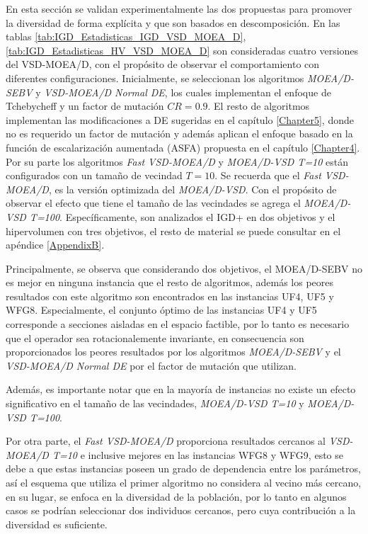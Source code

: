 En esta sección se validan experimentalmente las dos propuestas para promover la diversidad de forma explícita y que son basados en descomposición.
%
En las tablas \ref{tab:IGD_Estadisticas_IGD_VSD_MOEA_D}, \ref{tab:IGD_Estadisticas_HV_VSD_MOEA_D} son consideradas cuatro versiones del VSD-MOEA/D, con el propósito de observar el comportamiento con diferentes configuraciones.
%
Inicialmente, se seleccionan los algoritmos \textit{MOEA/D-SEBV} y \textit{VSD-MOEA/D Normal DE}, los cuales implementan el enfoque de Tchebycheff y un factor de mutación $CR=0.9$.
%
El resto de algoritmos implementan las modificaciones a DE sugeridas en el capítulo \ref{Chapter5}, donde no es requerido un factor de mutación y además aplican el enfoque basado en la función de escalarización aumentada (ASFA) propuesta en el capítulo \ref{Chapter4}.
%
Por su parte los algoritmos \textit{Fast VSD-MOEA/D} y \textit{MOEA/D-VSD T=10} están configurados con un tamaño de vecindad $T=10$.
%
Se recuerda que el \textit{Fast VSD-MOEA/D}, es la versión optimizada del \textit{MOEA/D-VSD}.
%
Con el propósito de observar el efecto que tiene el tamaño de las vecindades se agrega el \textit{MOEA/D-VSD T=100}.
%
Específicamente, son analizados el IGD+ en dos objetivos y el hipervolumen con tres objetivos, el resto de material se puede consultar en el apéndice \ref{AppendixB}.

Principalmente, se observa que considerando dos objetivos, el MOEA/D-SEBV no es mejor en ninguna instancia que el resto de algoritmos, además los peores resultados con este algoritmo son encontrados en las instancias UF4, UF5 y WFG8.
%
Especialmente, el conjunto óptimo de las instancias UF4 y UF5 corresponde a secciones aisladas en el espacio factible, por lo tanto es necesario que el operador sea rotacionalemente invariante, en consecuencia son proporcionados los peores resultados por los algoritmos \textit{MOEA/D-SEBV} y el \textit{VSD-MOEA/D Normal DE} por el factor de mutación que utilizan.

Además, es importante notar que en la mayoría de instancias no existe un efecto significativo en el tamaño de las vecindades,  \textit{MOEA/D-VSD T=10} y \textit{MOEA/D-VSD T=100}.

Por otra parte, el \textit{Fast VSD-MOEA/D} proporciona resultados cercanos al \textit{VSD-MOEA/D T=10} e inclusive mejores en las instancias WFG8 y WFG9, esto se debe a que estas instancias poseen un grado de dependencia entre los parámetros, así el esquema que utiliza el primer algoritmo no considera al vecino más cercano, en su lugar, se enfoca en la diversidad de la población, por lo tanto en algunos casos se podrían seleccionar dos individuos cercanos, pero cuya contribución a la diversidad es suficiente.

